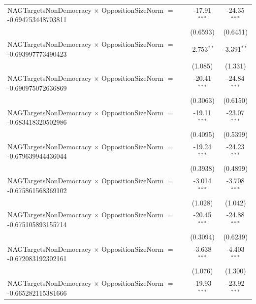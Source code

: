 \begin{tabular}{lcc}
   NAGTargetsNonDemocracy $\times$ OppositionSizeNorm $=$ -0.694753448703811    & -17.91$^{***}$       & -24.35$^{***}$\\   
                                                                                & (0.6593)             & (0.6451)\\   
   NAGTargetsNonDemocracy $\times$ OppositionSizeNorm $=$ -0.693997773490423    & -2.753$^{**}$        & -3.391$^{**}$\\   
                                                                                & (1.085)              & (1.331)\\   
   NAGTargetsNonDemocracy $\times$ OppositionSizeNorm $=$ -0.690975072636869    & -20.41$^{***}$       & -24.84$^{***}$\\   
                                                                                & (0.3063)             & (0.6150)\\   
   NAGTargetsNonDemocracy $\times$ OppositionSizeNorm $=$ -0.683418320502986    & -19.11$^{***}$       & -23.07$^{***}$\\   
                                                                                & (0.4095)             & (0.5399)\\   
   NAGTargetsNonDemocracy $\times$ OppositionSizeNorm $=$ -0.679639944436044    & -19.24$^{***}$       & -24.23$^{***}$\\   
                                                                                & (0.3938)             & (0.4899)\\   
   NAGTargetsNonDemocracy $\times$ OppositionSizeNorm $=$ -0.675861568369102    & -3.014$^{***}$       & -3.708$^{***}$\\   
                                                                                & (1.028)              & (1.042)\\   
   NAGTargetsNonDemocracy $\times$ OppositionSizeNorm $=$ -0.675105893155714    & -20.45$^{***}$       & -24.88$^{***}$\\   
                                                                                & (0.3094)             & (0.6239)\\   
   NAGTargetsNonDemocracy $\times$ OppositionSizeNorm $=$ -0.672083192302161    & -3.638$^{***}$       & -4.403$^{***}$\\   
                                                                                & (1.076)              & (1.300)\\   
   NAGTargetsNonDemocracy $\times$ OppositionSizeNorm $=$ -0.665282115381666    & -19.93$^{***}$       & -23.92$^{***}$\\   

\end{tabular}
